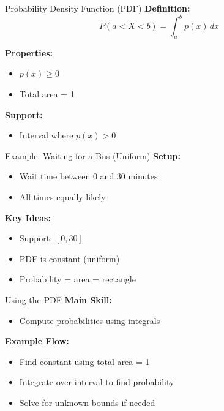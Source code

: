 \documentclass[dvipsnames]{beamer}
\begin{document}

\begin{frame}{Probability Density Function (PDF)}
\textbf{Definition:}
\[
P(a < X < b) = \int_a^b p(x)\,dx
\]

\textbf{Properties:}
\begin{itemize}
    \item $p(x) \ge 0$
    \item Total area = 1
\end{itemize}

\textbf{Support:}
\begin{itemize}
    \item Interval where $p(x) > 0$
\end{itemize}
\end{frame}


\begin{frame}{Example: Waiting for a Bus (Uniform)}
\textbf{Setup:}
\begin{itemize}
    \item Wait time between 0 and 30 minutes
    \item All times equally likely
\end{itemize}

\textbf{Key Ideas:}
\begin{itemize}
    \item Support: $[0,30]$
    \item PDF is constant (uniform)
    \item Probability = area = rectangle
\end{itemize}
\end{frame}


\begin{frame}{Using the PDF}
\textbf{Main Skill:}
\begin{itemize}
    \item Compute probabilities using integrals
\end{itemize}

\textbf{Example Flow:}
\begin{itemize}
    \item Find constant using total area = 1
    \item Integrate over interval to find probability
    \item Solve for unknown bounds if needed
\end{itemize}
\end{frame}
\end{document}
